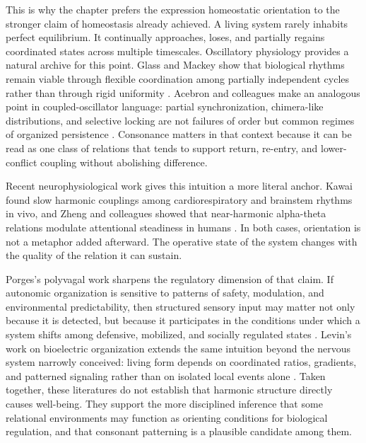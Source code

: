 This is why the chapter prefers the expression homeostatic orientation to the stronger claim of homeostasis already achieved. A living system rarely inhabits perfect equilibrium. It continually approaches, loses, and partially regains coordinated states across multiple timescales. Oscillatory physiology provides a natural archive for this point. Glass and Mackey show that biological rhythms remain viable through flexible coordination among partially independent cycles rather than through rigid uniformity \parencite{glass_1988}. Acebron and colleagues make an analogous point in coupled-oscillator language: partial synchronization, chimera-like distributions, and selective locking are not failures of order but common regimes of organized persistence \parencite{acebron_2005}. Consonance matters in that context because it can be read as one class of relations that tends to support return, re-entry, and lower-conflict coupling without abolishing difference.

Recent neurophysiological work gives this intuition a more literal anchor. Kawai found slow harmonic couplings among cardiorespiratory and brainstem rhythms in vivo, and Zheng and colleagues showed that near-harmonic alpha-theta relations modulate attentional steadiness in humans \parencite{kawai_2023, zheng_2025}. In both cases, orientation is not a metaphor added afterward. The operative state of the system changes with the quality of the relation it can sustain.

Porges's polyvagal work sharpens the regulatory dimension of that claim. If autonomic organization is sensitive to patterns of safety, modulation, and environmental predictability, then structured sensory input may matter not only because it is detected, but because it participates in the conditions under which a system shifts among defensive, mobilized, and socially regulated states \parencite{porges_2011, porges_2017}. Levin's work on bioelectric organization extends the same intuition beyond the nervous system narrowly conceived: living form depends on coordinated ratios, gradients, and patterned signaling rather than on isolated local events alone \parencite{levin_2021}. Taken together, these literatures do not establish that harmonic structure directly causes well-being. They support the more disciplined inference that some relational environments may function as orienting conditions for biological regulation, and that consonant patterning is a plausible candidate among them.


